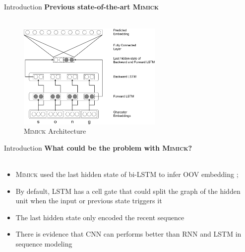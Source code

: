 \documentclass{beamer}
\begin{document}
\begin{frame}{Introduction}
    \textbf{Previous state-of-the-art \textsc{Mimick}}\\~\\

    \begin{figure}[H]
        \centering
        \includegraphics[width=70mm]{images/mimick}
        \caption{\textsc{Mimick} Architecture}
    \end{figure}
\end{frame}


\begin{frame}{Introduction}
    \textbf{What could be the problem with \textsc{Mimick}?}\\~\\

    \begin{itemize}
        \item \textsc{Mimick} used the last hidden state of bi-LSTM to
        infer OOV embedding \cite{mimicking2017Pinter};
        \item By default, LSTM has a cell gate that could split
        the graph of the hidden unit when the input or previous state
        triggers it
        \item The last hidden state only encoded the recent sequence
        \item There is evidence that CNN can performs better than RNN
        and LSTM in sequence modeling \cite{empirical2018shaujie}
    \end{itemize}
\end{frame}





\end{document}
